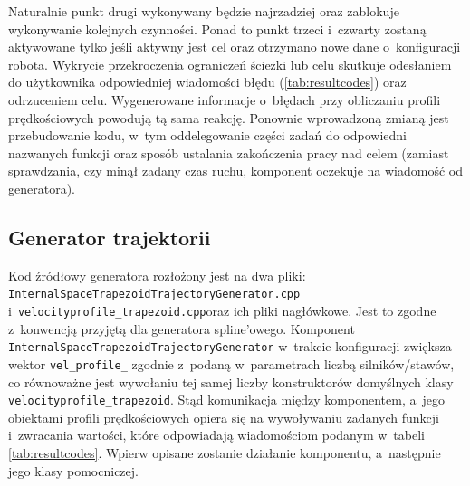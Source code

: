 \documentclass[a4paper, 12pt]{article}
\begin{document}
	Naturalnie punkt drugi wykonywany będzie  najrzadziej oraz zablokuje wykonywanie kolejnych czynności. Ponad to punkt trzeci i~czwarty zostaną aktywowane tylko jeśli aktywny jest cel oraz otrzymano nowe dane o~konfiguracji robota. Wykrycie przekroczenia ograniczeń ścieżki lub celu skutkuje odesłaniem do użytkownika odpowiedniej wiadomości błędu (\ref{tab:resultcodes}) oraz odrzuceniem celu. Wygenerowane informacje o~błędach przy obliczaniu profili prędkościowych powodują tą sama reakcję. Ponownie wprowadzoną zmianą jest przebudowanie kodu, w~tym oddelegowanie części zadań do odpowiedni nazwanych funkcji oraz sposób ustalania zakończenia pracy nad celem (zamiast sprawdzania, czy minął zadany czas ruchu, komponent oczekuje na wiadomość od generatora).
	
	\subsection{Generator trajektorii}
	\label{sec:trajgen}
	Kod źródłowy generatora rozłożony jest na dwa pliki: \linebreak \texttt{InternalSpaceTrapezoidTrajectoryGenerator.cpp} i~\texttt{velocityprofile\_trapezoid.cpp}\linebreak oraz ich pliki nagłówkowe. Jest to zgodne z~konwencją przyjętą dla generatora spline'owego. Komponent \texttt{InternalSpaceTrapezoidTrajectoryGenerator} w~trakcie konfiguracji zwiększa wektor \texttt{vel\_profile\_} zgodnie z~podaną w~parametrach liczbą silników/stawów, co równoważne jest wywołaniu tej samej liczby konstruktorów domyślnych klasy \texttt{velocityprofile\_trapezoid}. Stąd komunikacja między komponentem, a~jego obiektami profili prędkościowych opiera się na wywoływaniu zadanych funkcji i~zwracania wartości, które odpowiadają wiadomościom podanym w~tabeli \ref{tab:resultcodes}. Wpierw opisane zostanie działanie komponentu, a~następnie jego klasy pomocniczej. 
	
\end{document}
